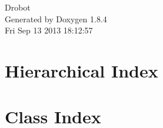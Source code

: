 \documentclass[twoside]{book}
\newcommand{\clearemptydoublepage}{%
  \newpage{\pagestyle{empty}\cleardoublepage}%
}
\begin{document}
\hypersetup{pageanchor=false}
\begin{titlepage}
\vspace*{7cm}
\begin{center}%
{\Large Drobot }\\
\vspace*{1cm}
{\large Generated by Doxygen 1.8.4}\\
\vspace*{0.5cm}
{\small Fri Sep 13 2013 18:12:57}\\
\end{center}
\end{titlepage}
\clearemptydoublepage
\tableofcontents
\clearemptydoublepage
{}
\hypersetup{pageanchor=true}

\chapter{Hierarchical Index}

\chapter{Class Index}

\end{document}
